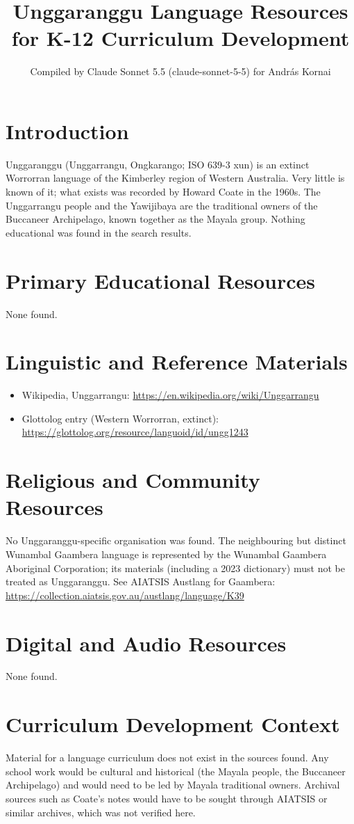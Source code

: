 \documentclass[12pt]{article}
\title{Unggaranggu Language Resources for K-12 Curriculum Development}
\author{Compiled by Claude Sonnet 5.5 (claude-sonnet-5-5) for Andr\'as Kornai}
\date{}
\begin{document}
\maketitle
\section{Introduction}
Unggaranggu (Unggarrangu, Ongkarango; ISO 639-3 xun) is an extinct Worrorran language of the Kimberley region of Western Australia. Very little is known of it; what exists was recorded by Howard Coate in the 1960s. The Unggarrangu people and the Yawijibaya are the traditional owners of the Buccaneer Archipelago, known together as the Mayala group. Nothing educational was found in the search results.
\section{Primary Educational Resources}
None found.
\section{Linguistic and Reference Materials}
\begin{itemize}
\item Wikipedia, Unggarrangu: \url{https://en.wikipedia.org/wiki/Unggarrangu}
\item Glottolog entry (Western Worrorran, extinct): \url{https://glottolog.org/resource/languoid/id/ungg1243}
\end{itemize}
\section{Religious and Community Resources}
No Unggaranggu-specific organisation was found. The neighbouring but distinct Wunambal Gaambera language is represented by the Wunambal Gaambera Aboriginal Corporation; its materials (including a 2023 dictionary) must not be treated as Unggaranggu. See AIATSIS Austlang for Gaambera: \url{https://collection.aiatsis.gov.au/austlang/language/K39}
\section{Digital and Audio Resources}
None found.
\section{Curriculum Development Context}
Material for a language curriculum does not exist in the sources found. Any school work would be cultural and historical (the Mayala people, the Buccaneer Archipelago) and would need to be led by Mayala traditional owners. Archival sources such as Coate's notes would have to be sought through AIATSIS or similar archives, which was not verified here.
\end{document}
